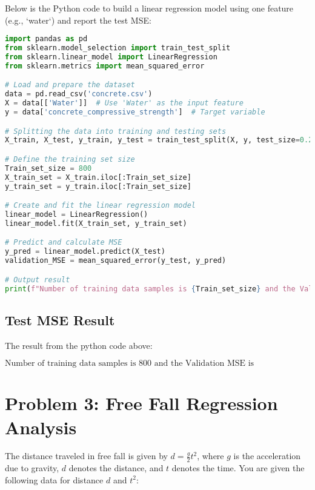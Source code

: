 \documentclass[a4paper,10pt]{article}
\begin{document}
Below is the Python code to build a linear regression model using one feature (e.g., `water`) and report the test MSE:

\begin{lstlisting}[language=Python, caption=Python Code for Linear Regression and MSE Calculation]
import pandas as pd
from sklearn.model_selection import train_test_split
from sklearn.linear_model import LinearRegression
from sklearn.metrics import mean_squared_error

# Load and prepare the dataset
data = pd.read_csv('concrete.csv')
X = data[['Water']]  # Use 'Water' as the input feature
y = data['concrete_compressive_strength']  # Target variable

# Splitting the data into training and testing sets
X_train, X_test, y_train, y_test = train_test_split(X, y, test_size=0.2, random_state=42)

# Define the training set size
Train_set_size = 800
X_train_set = X_train.iloc[:Train_set_size]
y_train_set = y_train.iloc[:Train_set_size]

# Create and fit the linear regression model
linear_model = LinearRegression()
linear_model.fit(X_train_set, y_train_set)

# Predict and calculate MSE
y_pred = linear_model.predict(X_test)
validation_MSE = mean_squared_error(y_test, y_pred)

# Output result
print(f"Number of training data samples is {Train_set_size} and the Validation MSE is {validation_MSE}")
\end{lstlisting}

\subsection*{Test MSE Result}

The result from the python code above:

\[
\text{Number of training data samples is 800 and the Validation MSE is 232.7491698027472}
\]


\newpage
\section*{Problem 3: Free Fall Regression Analysis}

The distance traveled in free fall is given by \( d = \frac{g}{2} t^2 \), where \( g \) is the acceleration due to gravity, \( d \) denotes the distance, and \( t \) denotes the time. You are given the following data for distance \( d \) and \( t^2 \):
\end{document}
